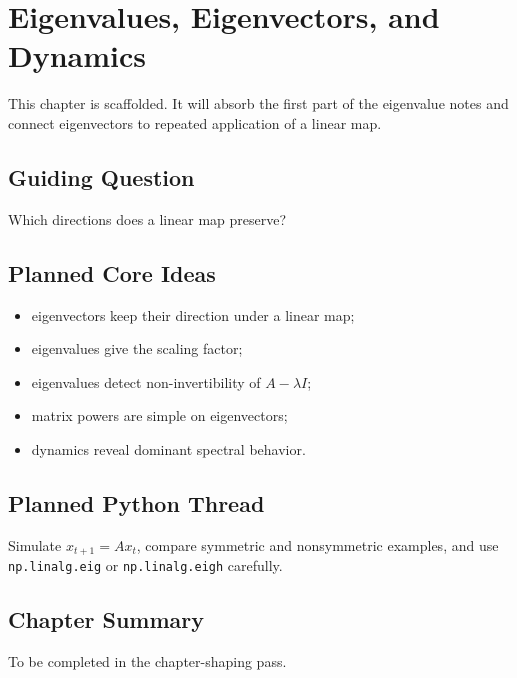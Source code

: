 \chapter{Eigenvalues, Eigenvectors, and Dynamics}
\label{ch:eigenvalues-dynamics}

\begin{draftbox}
This chapter is scaffolded. It will absorb the first part of the eigenvalue
notes and connect eigenvectors to repeated application of a linear map.
\end{draftbox}

\section{Guiding Question}

Which directions does a linear map preserve?

\section{Planned Core Ideas}

\begin{itemize}
  \item eigenvectors keep their direction under a linear map;
  \item eigenvalues give the scaling factor;
  \item eigenvalues detect non-invertibility of $A-\lambda I$;
  \item matrix powers are simple on eigenvectors;
  \item dynamics reveal dominant spectral behavior.
\end{itemize}

\section{Planned Python Thread}

Simulate $x_{t+1}=Ax_t$, compare symmetric and nonsymmetric examples, and use
\texttt{np.linalg.eig} or \texttt{np.linalg.eigh} carefully.

\section*{Chapter Summary}

To be completed in the chapter-shaping pass.


